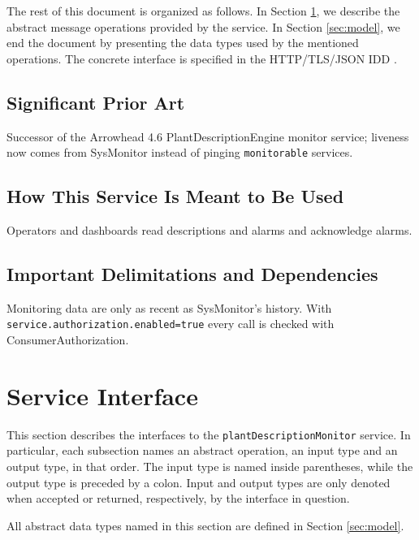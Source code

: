 \documentclass[a4paper]{arrowhead}
\begin{document}
The rest of this document is organized as follows.
In Section \ref{sec:operations}, we describe the abstract message operations provided by the service.
In Section \ref{sec:model}, we end the document by presenting the data types used by the mentioned operations.
The concrete interface is specified in the HTTP/TLS/JSON IDD \cite{pde-plantDescriptionMonitor-http-idd}.

\subsection{Significant Prior Art}

Successor of the Arrowhead 4.6 Plant\allowbreak{}Description\allowbreak{}Engine monitor service; liveness now comes from SysMonitor instead of pinging \texttt{monitorable} services.

\subsection{How This Service Is Meant to Be Used}

Operators and dashboards read descriptions and alarms and acknowledge alarms.

\subsection{Important Delimitations and Dependencies}
\label{sec:delimitations}

Monitoring data are only as recent as SysMonitor's history. With \texttt{service.\allowbreak{}authorization.\allowbreak{}enabled=\allowbreak{}true} every call is checked with Consumer\allowbreak{}Authorization.

\newpage

\section{Service Interface}
\label{sec:operations}

This section describes the interfaces to the \texttt{plant\allowbreak{}Description\allowbreak{}Monitor} service.
In particular, each subsection names an abstract operation, an input type and an output type, in that order.
The input type is named inside parentheses, while the output type is preceded by a colon.
Input and output types are only denoted when accepted or returned, respectively, by the interface in question.

All abstract data types named in this section are defined in Section \ref{sec:model}.
\end{document}
